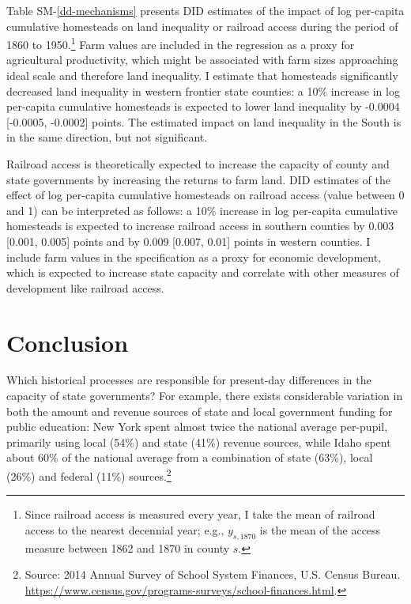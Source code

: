 \documentclass[12pt]{article}
\begin{document}
Table SM-\ref{dd-mechanisms} presents DID estimates of the impact of log per-capita cumulative homesteads on land inequality or railroad access during the period of 1860 to 1950.\footnote{Since railroad access is measured every year, I take the mean of railroad access to the nearest decennial year; e.g., $y_{s, 1870}$ is the mean of the access measure between 1862 and 1870 in county $s$.} Farm values are included in the regression as a proxy for agricultural productivity, which might be associated with farm sizes approaching ideal scale and therefore land inequality. I estimate that homesteads significantly decreased land inequality in western frontier state counties: a 10\% increase in log per-capita cumulative homesteads is expected to lower land inequality by -0.0004 [-0.0005, -0.0002] points. The estimated impact on land inequality in the South is in the same direction, but not significant. 

Railroad access is theoretically expected to increase the capacity of county and state governments by increasing the returns to farm land. DID estimates of the effect of log per-capita cumulative homesteads on railroad access (value between 0 and 1) can be interpreted as follows: a 10\% increase in log per-capita cumulative homesteads is expected to increase railroad access in southern counties by 0.003 [0.001, 0.005] points and by 0.009 [0.007, 0.01] points in western counties. I include farm values in the specification as a proxy for economic development, which is expected to increase state capacity and correlate with other measures of development like railroad access. 

\section{Conclusion} \label{discussion} 

Which historical processes are responsible for present-day differences in the capacity of state governments? For example, there exists considerable variation in both the amount and revenue sources of state and local government funding for public education: New York spent almost twice the national average per-pupil, primarily using local (54\%) and state (41\%) revenue sources, while Idaho spent about 60\% of the national average from a combination of state (63\%), local (26\%) and federal (11\%) sources.\footnote{Source: 2014 Annual Survey of School System Finances, U.S. Census Bureau. \url{https://www.census.gov/programs-surveys/school-finances.html}.}
\end{document}
